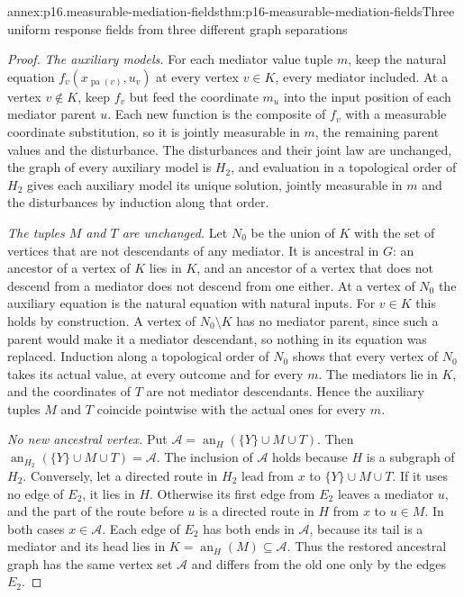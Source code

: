 \begin{annexitem}{annex:p16.measurable-mediation-fields}{thm:p16-measurable-mediation-fields}{Three uniform response fields from three different graph separations}
\begin{proof}
\emph{The auxiliary models.} For each mediator value tuple \(m\),
keep the natural equation \(f_v(x_{\operatorname{pa}(v)},u_v)\) at
every vertex \(v\in K\), every mediator included. At a vertex
\(v\notin K\), keep \(f_v\) but feed the coordinate \(m_u\) into the
input position of each mediator parent \(u\). Each new function is the
composite of \(f_v\) with a measurable coordinate substitution, so it
is jointly measurable in \(m\), the remaining parent values and the
disturbance. The disturbances and their joint law are unchanged, the
graph of every auxiliary model is \(H_2\), and evaluation in a
topological order of \(H_2\) gives each auxiliary model its unique
solution, jointly measurable in \(m\) and the disturbances by
induction along that order.

\emph{The tuples \(M\) and \(T\) are unchanged.} Let \(N_0\) be the
union of \(K\) with the set of vertices that are not descendants of
any mediator. It is ancestral in \(G\): an ancestor of a vertex of
\(K\) lies in \(K\), and an ancestor of a vertex that does not descend
from a mediator does not descend from one either. At a vertex of
\(N_0\) the auxiliary equation is the natural equation with natural
inputs. For \(v\in K\) this holds by construction. A vertex of
\(N_0\setminus K\) has no mediator parent, since such a parent would
make it a mediator descendant, so nothing in its equation was
replaced. Induction along a topological order of \(N_0\) shows that
every vertex of \(N_0\) takes its actual value, at every outcome and
for every \(m\). The mediators lie in \(K\), and the coordinates of
\(T\) are not mediator descendants. Hence the auxiliary tuples
\(M\) and \(T\) coincide pointwise with the actual ones for every
\(m\).

\emph{No new ancestral vertex.} Put
\(\mathcal A=\operatorname{an}_H(\{Y\}\cup M\cup T)\). Then
\(\operatorname{an}_{H_2}(\{Y\}\cup M\cup T)=\mathcal A\). The
inclusion of \(\mathcal A\) holds because \(H\) is a subgraph of
\(H_2\). Conversely, let a directed route in \(H_2\) lead from \(x\)
to \(\{Y\}\cup M\cup T\). If it uses no edge of \(E_2\), it lies in
\(H\). Otherwise its first edge from \(E_2\) leaves a mediator \(u\),
and the part of the route before \(u\) is a directed route in \(H\)
from \(x\) to \(u\in M\). In both cases \(x\in\mathcal A\). Each edge
of \(E_2\) has both ends in \(\mathcal A\), because its tail is a
mediator and its head lies in \(K=\operatorname{an}_H(M)\subseteq
\mathcal A\). Thus the restored ancestral graph has the same vertex
set \(\mathcal A\) and differs from the old one only by the edges
\(E_2\).


\end{proof}
\end{annexitem}
